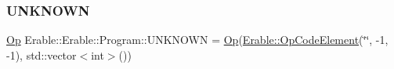 \subsubsection{\texorpdfstring{UNKNOWN}{UNKNOWN}}
{\footnotesize\ttfamily \mbox{\hyperlink{struct_erable_1_1_erable_1_1_program_1_1_op}{Op}} Erable\+::\+Erable\+::\+Program\+::\+U\+N\+K\+N\+O\+WN = \mbox{\hyperlink{struct_erable_1_1_erable_1_1_program_1_1_op}{Op}}(\mbox{\hyperlink{class_erable_1_1_op_code_element}{Erable\+::\+Op\+Code\+Element}}(\char`\"{}\char`\"{}, -\/1, -\/1), std\+::vector$<$int$>$())\hspace{0.3cm}{\ttfamily [inline]}}

